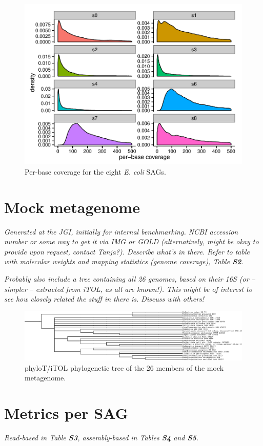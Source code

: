 \documentclass{bioinfo2}
\begin{document}
\begin{figure}[t]
\centering
\includegraphics[width=.5\textwidth]{sag_depth}
\caption{Per-base coverage for the eight \textit{E. coli} SAGs.}
\end{figure}

\section{Mock metagenome}

\textit{Generated at the JGI, initially for internal benchmarking. NCBI accession number or some way to get it via IMG or GOLD (alternatively, might be okay to provide upon request, contact Tanja?). Describe what's in there. Refer to table with molecular weights and mapping statistics (genome coverage), Table \textbf{S2}.}

\textit{Probably also include a tree containing all 26 genomes, based on their 16S (or -- simpler -- extracted from iTOL, as all are known!). This might be of interest to see how closely related the stuff in there is. Discuss with others!}

\begin{figure}[t]
\centering
\includegraphics[width=\textwidth]{tree_normal}
\caption{phyloT/iTOL \citep{itol,itol2} phylogenetic tree of the 26 members of the mock metagenome.}
\end{figure}

\section{Metrics per SAG}

\textit{Read-based in Table \textbf{S3}, assembly-based in Tables \textbf{S4} and \textbf{S5}.}
\end{document}
